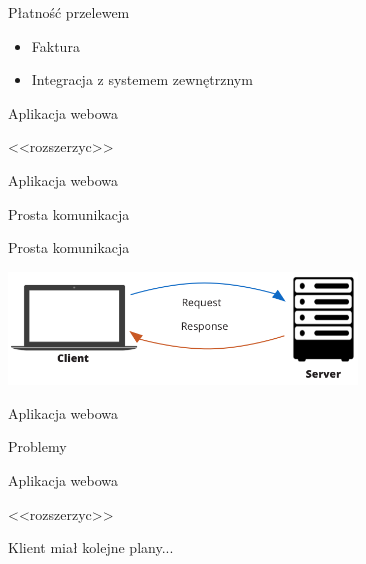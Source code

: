 \documentclass{beamer}
\begin{document}
\begin{frame}{Płatność przelewem}
	\begin{huge}
		\begin{itemize}[<+->]
			\item Faktura
			\item Integracja z systemem zewnętrznym
		\end{itemize}
	\end{huge}
\end{frame}

\begin{frame}{Aplikacja webowa}
	\begin{center}
		\Huge{<<rozszerzyc>>}
	\end{center}
\end{frame}

\begin{frame}{Aplikacja webowa}
	\begin{center}
		\Huge{Prosta komunikacja}
	\end{center}
\end{frame}

\begin{frame}{Prosta komunikacja}
	\begin{center}
		\includegraphics[height=3cm]{prosta_komunikacja2.png}
	\end{center}
\end{frame}

\begin{frame}{Aplikacja webowa}
	\begin{center}
		\Huge{Problemy}
	\end{center}
\end{frame}

\begin{frame}{Aplikacja webowa}
	\begin{center}
		\Huge{<<rozszerzyc>>}
	\end{center}
\end{frame}

\begin{frame}{}
	\begin{center}
		\Huge{Klient miał kolejne plany...}
	\end{center}
\end{frame}
\end{document}
